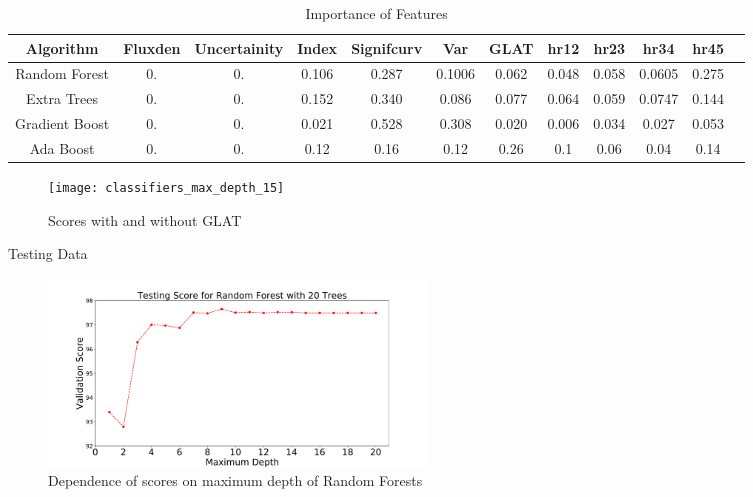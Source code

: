 \documentclass{beamer}
\begin{document}
\begin{frame}
\begin{table}[!h]
    \tiny
    \centering
    \renewcommand{\tabcolsep}{1mm}
\renewcommand{\arraystretch}{1.5}

    \begin{tabular}{|c|c|c|c|c|c|c|c|c|c|c|c|}
    \hline
    Algorithm &Fluxden & Uncertainity & Index&Signifcurv&Var&GLAT&hr12&hr23&hr34&hr45\\
    \hline
    Random Forest& 0. &        0. &        0.106 &0.287 &0.1006& 0.062& 0.048& 0.058& 0.0605& 0.275  \\
    \hline
    Extra Trees & 0.       &  0. &        0.152 &0.340 &0.086& 0.077& 0.064 &0.059& 0.0747 &0.144\\
    \hline %
    Gradient Boost& 0.      &   0.   &      0.021 & 0.528 &0.308  &0.020& 0.006& 0.034 &0.027 &0.053 \\
    \hline %
    Ada Boost& 0. &  0. &  0.12& 0.16& 0.12 &0.26& 0.1 & 0.06& 0.04 &0.14 \\
    \hline
     
    \end{tabular}

    \caption{Importance of Features}
    \label{tab:my_labe2l}
\end{table}{}
\end{frame}

\begin{frame}
\begin{figure}[!h]
    \centering
    \texttt{[image: classifiers\_max\_depth\_15]}
    \caption{Scores with and without GLAT}
    \label{fig:mot}
\end{figure}

\end{frame}

\begin{frame}{Testing Data}
\begin{figure}[!h]
    \centering
    \includegraphics[height=5cm,width=8 cm]{depthvsscore_rf_10seeds_20trees}
    \caption{Dependence of scores on maximum depth of Random Forests}
    \label{fig:mot5}
\end{figure}

\end{frame}
\end{document}
